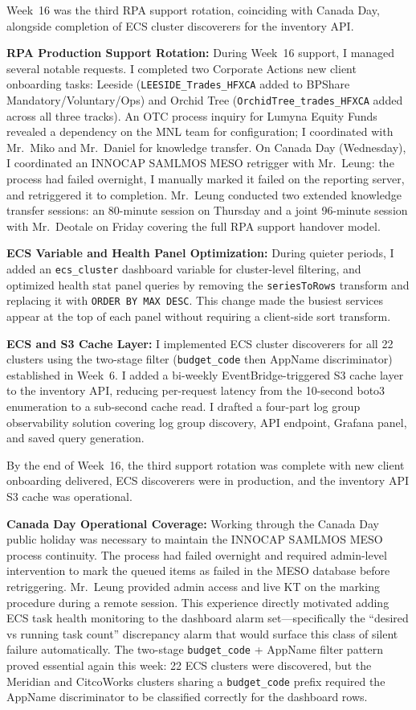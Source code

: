 Week~16 was the third RPA support rotation, coinciding with Canada Day,
alongside completion of ECS cluster discoverers for the inventory API.

\textbf{RPA Production Support Rotation:} 
During Week~16 support, I managed several notable requests. I completed two Corporate Actions new client onboarding
tasks: Leeside (\texttt{LEESIDE\_Trades\_HFXCA}
added to BPShare Mandatory/Voluntary/Ops) and Orchid Tree
(\texttt{OrchidTree\_trades\_HFXCA} added across all three tracks). An OTC
process inquiry for Lumyna Equity Funds revealed a dependency
on the MNL team for configuration; I coordinated with Mr.\ Miko
and Mr.\ Daniel for knowledge transfer. On Canada Day (Wednesday), I coordinated an INNOCAP
SAMLMOS MESO retrigger with Mr.\ Leung: the process had failed
overnight, I manually marked it failed on the reporting server, and retriggered it to completion.
Mr.\ Leung conducted two extended knowledge transfer sessions: an 80-minute session on
Thursday and a joint 96-minute session with Mr.\ Deotale on Friday covering the
full RPA support handover model.

\textbf{ECS Variable and Health Panel Optimization:} 
During
quieter periods, I added an \texttt{ecs\_cluster} dashboard variable for
cluster-level filtering, and optimized health stat panel queries by
removing the \texttt{seriesToRows} transform and replacing it with
\texttt{ORDER BY MAX DESC}. This change made the busiest services appear
at the top of each panel without requiring a client-side sort transform.

\textbf{ECS and S3 Cache Layer:} 
I implemented ECS cluster discoverers for all 22 clusters
using the two-stage filter (\texttt{budget\_code} then AppName discriminator)
established in Week~6. I added a bi-weekly EventBridge-triggered S3 cache
layer to the inventory API, reducing per-request latency from the
10-second boto3 enumeration to a sub-second cache read. I drafted a four-part log group observability solution covering
log group discovery, API endpoint, Grafana panel, and saved query generation.

By the end of Week~16, the third support rotation was complete with new
client onboarding delivered, ECS discoverers were in production, and the
inventory API S3 cache was operational.

\textbf{Canada Day Operational Coverage:} 
Working through the Canada Day
public holiday was necessary to maintain the INNOCAP SAMLMOS
MESO process continuity. The process had failed overnight and required
admin-level intervention to mark the queued items as failed in the MESO database before
retriggering. Mr.\ Leung provided admin access and live KT on the marking
procedure during a remote session. This experience directly motivated
adding ECS task health monitoring to the dashboard alarm set---specifically the ``desired vs running task count'' discrepancy alarm
that would surface this class of silent failure automatically.
The two-stage \texttt{budget\_code} + AppName filter pattern proved essential again
this week: 22 ECS clusters were discovered, but the Meridian and
CitcoWorks clusters sharing a \texttt{budget\_code} prefix required the AppName
discriminator to be classified correctly for the dashboard rows.

